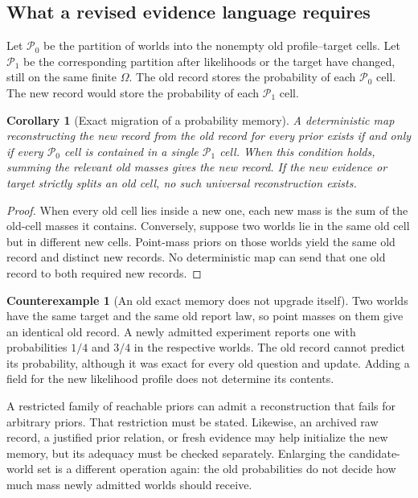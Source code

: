 \documentclass[11pt,letterpaper]{article}
\theoremstyle{plain}
\newtheorem{corollary}[theorem]{Corollary}
\theoremstyle{definition}
\newtheorem{counterexample}[theorem]{Counterexample}
\begin{document}
\subsection{What a revised evidence language requires}
Let $\mathcal P_0$ be the partition of worlds into the nonempty old profile--target cells. Let $\mathcal P_1$ be the corresponding partition after likelihoods or the target have changed, still on the same finite $\Omega$. The old record stores the probability of each $\mathcal P_0$ cell. The new record would store the probability of each $\mathcal P_1$ cell.

\begin{corollary}[Exact migration of a probability memory]\label{cor:memorymigration}
A deterministic map reconstructing the new record from the old record for every prior exists if and only if every $\mathcal P_0$ cell is contained in a single $\mathcal P_1$ cell. When this condition holds, summing the relevant old masses gives the new record. If the new evidence or target strictly splits an old cell, no such universal reconstruction exists.
\end{corollary}
\begin{proof}
When every old cell lies inside a new one, each new mass is the sum of the old-cell masses it contains. Conversely, suppose two worlds lie in the same old cell but in different new cells. Point-mass priors on those worlds yield the same old record and distinct new records. No deterministic map can send that one old record to both required new records.
\end{proof}

\begin{counterexample}[An old exact memory does not upgrade itself]\label{ce:memorymigration}
Two worlds have the same target and the same old report law, so point masses on them give an identical old record. A newly admitted experiment reports one with probabilities $1/4$ and $3/4$ in the respective worlds. The old record cannot predict its probability, although it was exact for every old question and update. Adding a field for the new likelihood profile does not determine its contents.
\end{counterexample}

A restricted family of reachable priors can admit a reconstruction that fails for arbitrary priors. That restriction must be stated. Likewise, an archived raw record, a justified prior relation, or fresh evidence may help initialize the new memory, but its adequacy must be checked separately. Enlarging the candidate-world set is a different operation again: the old probabilities do not decide how much mass newly admitted worlds should receive.
\end{document}

